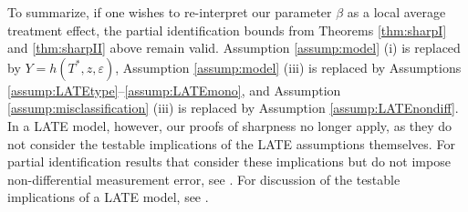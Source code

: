 To summarize, if one wishes to re-interpret our parameter $\beta$ as a local average treatment effect, the partial identification bounds from Theorems \ref{thm:sharpI} and \ref{thm:sharpII} above remain valid.
Assumption \ref{assump:model} (i) is replaced by $Y = h(T^*,z,\varepsilon)$, Assumption \ref{assump:model} (iii) is replaced by Assumptions \ref{assump:LATEtype}--\ref{assump:LATEmono}, and Assumption \ref{assump:misclassification} (iii) is replaced by Assumption \ref{assump:LATEnondiff}.
In a LATE model, however, our proofs of sharpness no longer apply, as they do not consider the testable implications of the LATE assumptions themselves.
For partial identification results that consider these implications but do not impose non-differential measurement error, see \cite{Ura}.
For discussion of the testable implications of a LATE model, see \cite{kitagawa}.

